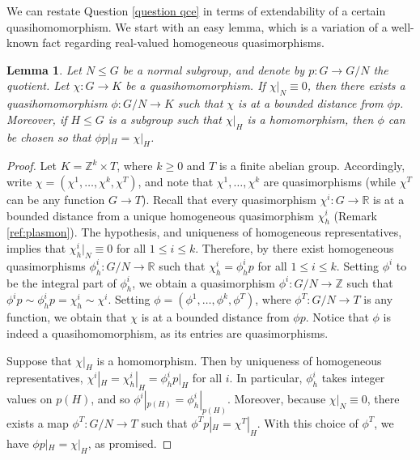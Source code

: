 \documentclass[svgnames]{amsart}
\theoremstyle{plain}
\newtheorem{lemma}[thm]{Lemma}
\theoremstyle{definition}
\newcommand{\Z}{\mathbb{Z}}
\begin{document}
We can restate Question \ref{question qce} in terms of extendability of a certain quasihomomorphism. We start with an easy lemma, which is a variation of a well-known fact regarding real-valued homogeneous quasimorphisms.

\begin{lemma}
\label{induced qm}
    Let $N \le G$ be a normal subgroup, and denote by $p \colon G \to G/N$ the quotient. Let $\chi \colon G \to K$ be a quasihomomorphism. If $\chi|_N \equiv 0$, then there exists a quasihomomorphism $\phi \colon G/N \to K$ such that $\chi$ is at a bounded distance from $\phi p$. Moreover, if $H \le G$ is a subgroup such that $\chi|_H$ is a homomorphism, then $\phi$ can be chosen so that $\phi p|_H = \chi|_H$.
\end{lemma}


\begin{proof}
    Let $K = \Z^k \times T$, where $k \geq 0$ and $T$ is a finite abelian group. Accordingly, write $\chi = (\chi^1, \ldots, \chi^k, \chi^T)$, and note that $\chi^1, \ldots, \chi^k$ are quasimorphisms (while $\chi^T$ can be any function $G \to T$).    
    Recall that every quasimorphism $\chi^i \colon G \to \mathbb{R}$ is at a bounded distance from a unique homogeneous quasimorphism $\chi^i_h$ (Remark \ref{ref:plasmon}). The hypothesis, and uniqueness of homogeneous representatives, implies that $\chi^i_h|_N \equiv 0$ for all $1 \leq i \leq k$. Therefore, by \cite[Remark 2.90]{calegari} there exist homogeneous quasimorphisms $\phi^i_h \colon G/N \to \mathbb{R}$ such that $\chi^i_h = \phi^i_h p$ for all $1\le i\le k$. Setting $\phi^i$ to be the integral part of $\phi^i_h$, we obtain a quasimorphism $\phi^i \colon G/N \to \mathbb{Z}$ such that $\phi^i p \sim \phi^i_h p = \chi^i_h \sim \chi^i$. Setting $\phi = (\phi^1, \ldots, \phi^k, \phi^T)$, where $\phi^T \colon G/N \to T$ is any function, we obtain that $\chi$ is at a bounded distance from $\phi p$. Notice that $\phi$ is indeed a quasihomomorphism, as its entries are quasimorphisms. 

    Suppose that $\chi|_H$ is a homomorphism. Then by uniqueness of homogeneous representatives, $\chi^i|_H = \chi^i_h |_H = \phi^i_h p|_H$ for all $i$. In particular, $\phi^i_h$ takes integer values on $p(H)$, and so $\phi^i|_{p(H)} = \phi^i_h|_{p(H)}$. Moreover, because $\chi|_N \equiv 0$, there exists a map $\phi^T \colon G/N \to T$ such that $\phi^T p|_H = \chi^T|_H$. With this choice of $\phi^T$, we have $\phi p|_H = \chi|_H$, as promised.
\end{proof}
\end{document}
